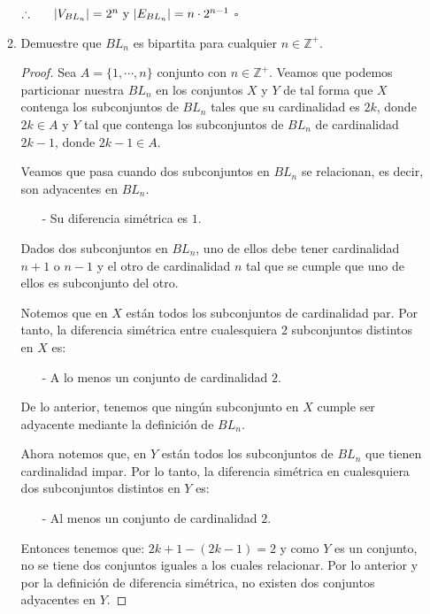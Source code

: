 \documentclass{article}
\begin{document}
\begin{enumerate}
\begin{enumerate}
    \hspace*{4 cm} $\therefore\ \ \ \ \ \abs{V_{BL_n}} = 2^n
    \text{ y } |E_{BL_n}| = n \cdot 2^{n -1}$
    \hfill $\square$
    
    
  \item Demuestre que $BL_n$ es bipartita para cualquier $n \in \mathbb{Z}^+$. 
    
    \begin{proof}
      
      Sea $A = \{1, \dotsm,n\}$ conjunto con $n \in \mathbb{Z}^+$.     
      Veamos que podemos particionar nuestra $BL_n$ en los conjuntos
      $X$ y $Y$ de tal forma que $X$ contenga los subconjuntos de
      $BL_n$ tales que su cardinalidad es $2k$, donde $2k \in A$  y
      $Y$ tal que contenga los subconjuntos de $BL_n$ de cardinalidad
      $2k -1$, donde $2k -1 \in A$.
      
      Veamos que pasa cuando dos subconjuntos en $BL_n$ se relacionan,
      es decir, son adyacentes en $BL_n$.
      \begin{itemize}
      \item[-] Su diferencia simétrica es $1$.
      \end{itemize}
      Dados dos subconjuntos en $BL_n$, uno de ellos debe tener cardinalidad
      $n+1$ o $n-1$ y el otro de cardinalidad $n$ tal que se cumple que uno
      de ellos es subconjunto del otro.
      
      Notemos que en $X$ están todos los subconjuntos de cardinalidad par.
      Por tanto, la diferencia simétrica entre cualesquiera 2 subconjuntos
      distintos en $X$ es:
      \begin{itemize}
      \item[-] A lo menos un conjunto de cardinalidad $2$.
      \end{itemize}
      De lo anterior, tenemos que ningún subconjunto en
      $X$ cumple ser adyacente mediante la definición de $BL_n$.
      
      Ahora notemos que, en $Y$ están todos los subconjuntos de
      $BL_n$  que tienen cardinalidad impar. Por lo tanto, la
      diferencia simétrica en cualesquiera dos subconjuntos
      distintos en $Y$ es:
      \begin{itemize}
      \item[-] Al menos un conjunto de cardinalidad $2$.
      \end{itemize}
      Entonces tenemos que: $2k + 1 - (2k -1) = 2$ y como $Y$
      es un conjunto, no se tiene dos conjuntos iguales a los
      cuales relacionar. Por lo anterior y por la definición de
      diferencia simétrica, no existen dos conjuntos adyacentes
      en $Y$.
      

\end{proof}
\end{enumerate}
\end{enumerate}
\end{document}
